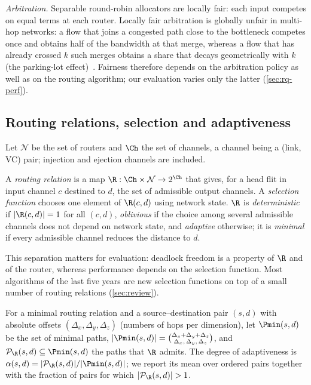 \emph{Arbitration.} Separable round-robin allocators are locally fair: each input competes on equal terms at each router. Locally fair arbitration is globally unfair in multi-hop networks: a flow that joins a congested path close to the bottleneck competes once and obtains half of the bandwidth at that merge, whereas a flow that has already crossed $k$ such merges obtains a share that decays geometrically with $k$ (the parking-lot effect)~\cite{dally2004principles}. Fairness therefore depends on the arbitration policy as well as on the routing algorithm; our evaluation varies only the latter (\cref{sec:rq-perf}).

\subsection{Routing relations, selection and adaptiveness}
\label{sec:bg-routing}

Let $\mathcal{N}$ be the set of routers and $\Ch$ the set of channels, a channel being a (link, VC) pair; injection and ejection channels are included.

\begin{definition}\label{def:routing}
A \emph{routing relation} is a map $\R:\Ch\times\mathcal{N}\to 2^{\Ch}$ that gives, for a head flit in input channel $c$ destined to $d$, the set of admissible output channels. A \emph{selection function} chooses one element of $\R(c,d)$ using network state. $\R$ is \emph{deterministic} if $|\R(c,d)|=1$ for all $(c,d)$, \emph{oblivious} if the choice among several admissible channels does not depend on network state, and \emph{adaptive} otherwise; it is \emph{minimal} if every admissible channel reduces the distance to $d$.
\end{definition}

This separation matters for evaluation: deadlock freedom is a property of $\R$ and of the router, whereas performance depends on the selection function. Most algorithms of the last five years are new selection functions on top of a small number of routing relations (\cref{sec:review}).

\begin{definition}\label{def:alpha}
For a minimal routing relation and a source--destination pair $(s,d)$ with absolute offsets $(\Delta_x,\Delta_y,\Delta_z)$ (numbers of hops per dimension), let $\Pmin(s,d)$ be the set of minimal paths, $|\Pmin(s,d)|=\binom{\Delta_x+\Delta_y+\Delta_z}{\Delta_x,\,\Delta_y,\,\Delta_z}$, and $\mathcal{P}_\R(s,d)\subseteq\Pmin(s,d)$ the paths that $\R$ admits. The degree of adaptiveness is $\alpha(s,d)=|\mathcal{P}_\R(s,d)|/|\Pmin(s,d)|$; we report its mean over ordered pairs together with the fraction of pairs for which $|\mathcal{P}_\R(s,d)|>1$.
\end{definition}

